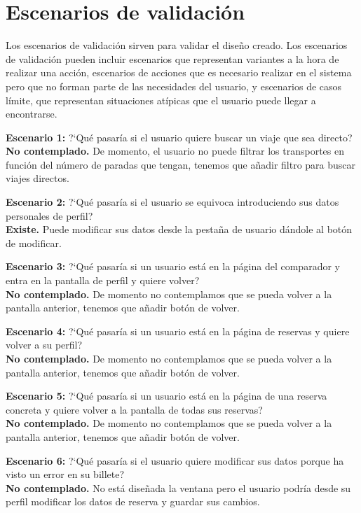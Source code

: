 \section{Escenarios de validación}

Los escenarios de validación sirven para validar el diseño creado. Los escenarios de validación pueden incluir escenarios que representan variantes a la hora de realizar una acción, escenarios de acciones que es necesario realizar en el sistema pero que no forman parte de las necesidades del usuario, y escenarios de casos límite, que representan situaciones atípicas que el usuario puede llegar a encontrarse.

\textbf{Escenario 1:} ?`Qué pasaría si el usuario quiere buscar un viaje que sea directo? \\
\textbf{No contemplado.} De momento, el usuario no puede filtrar los transportes en función del número de paradas que tengan, tenemos que añadir filtro para buscar viajes directos.

\textbf{Escenario 2:} ?`Qué pasaría si el usuario se equivoca introduciendo sus datos personales de perfil? \\
\textbf{Existe.} Puede modificar sus datos desde la pestaña de usuario dándole al botón de modificar.

\textbf{Escenario 3:} ?`Qué pasaría si un usuario está en la página del comparador y entra en la pantalla de perfil y quiere volver? \\
\textbf{No contemplado.} De momento no contemplamos que se pueda volver a la pantalla anterior, tenemos que añadir botón de volver.

\textbf{Escenario 4:} ?`Qué pasaría si un usuario está en la página de reservas y quiere volver a su perfil? \\
\textbf{No contemplado.} De momento no contemplamos que se pueda volver a la pantalla anterior, tenemos que añadir botón de volver.

\textbf{Escenario 5:} ?`Qué pasaría si un usuario está en la página de una reserva concreta y quiere volver a la pantalla de todas sus reservas? \\
\textbf{No contemplado.} De momento no contemplamos que se pueda volver a la pantalla anterior, tenemos que añadir botón de volver.

\textbf{Escenario 6:} ?`Qué pasaría si el usuario quiere modificar sus datos porque ha visto un error en su billete? \\
\textbf{No contemplado.} No está diseñada la ventana pero el usuario podría desde su perfil modificar los datos de reserva y guardar sus cambios.

